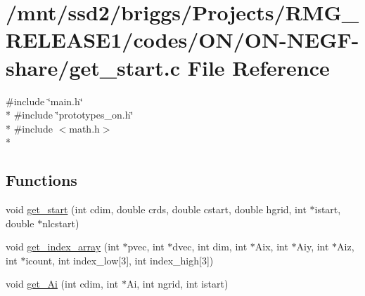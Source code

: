 \hypertarget{_o_n_2_o_n-_n_e_g_f-share_2get__start_8c}{\section{/mnt/ssd2/briggs/\-Projects/\-R\-M\-G\-\_\-\-R\-E\-L\-E\-A\-S\-E1/codes/\-O\-N/\-O\-N-\/\-N\-E\-G\-F-\/share/get\-\_\-start.c File Reference}
\label{_o_n_2_o_n-_n_e_g_f-share_2get__start_8c}
}
{\ttfamily \#include \char`\"{}main.\-h\char`\"{}}\\*
{\ttfamily \#include \char`\"{}prototypes\-\_\-on.\-h\char`\"{}}\\*
{\ttfamily \#include $<$math.\-h$>$}\\*
\subsection*{Functions}
\begin{DoxyCompactItemize}
\item 
void \hyperlink{_o_n_2_o_n-_n_e_g_f-share_2get__start_8c_ab0edde6b492b46f80a7454630be5d260}{get\-\_\-start} (int cdim, double crds, double cstart, double hgrid, int $\ast$istart, double $\ast$nlcstart)
\item 
void \hyperlink{_o_n_2_o_n-_n_e_g_f-share_2get__start_8c_a5f53ac26e982aa99b7c99e4b6b470602}{get\-\_\-index\-\_\-array} (int $\ast$pvec, int $\ast$dvec, int dim, int $\ast$Aix, int $\ast$Aiy, int $\ast$Aiz, int $\ast$icount, int index\-\_\-low\mbox{[}3\mbox{]}, int index\-\_\-high\mbox{[}3\mbox{]})
\item 
void \hyperlink{_o_n_2_o_n-_n_e_g_f-share_2get__start_8c_a58036a52ab5546b6c21ac7e258385ed1}{get\-\_\-\-Ai} (int cdim, int $\ast$Ai, int ngrid, int istart)
\end{DoxyCompactItemize}


